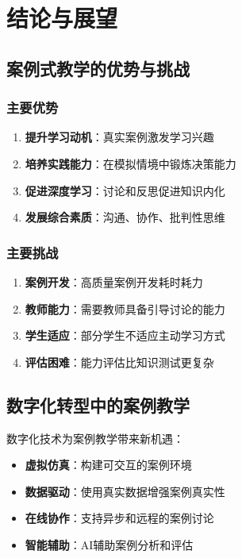 \documentclass[12pt,a4paper]{ctexart}
\begin{document}
\section{结论与展望}

\subsection{案例式教学的优势与挑战}

\subsubsection{主要优势}

\begin{enumerate}[leftmargin=2em]
    \item \textbf{提升学习动机}：真实案例激发学习兴趣
    \item \textbf{培养实践能力}：在模拟情境中锻炼决策能力
    \item \textbf{促进深度学习}：讨论和反思促进知识内化
    \item \textbf{发展综合素质}：沟通、协作、批判性思维
\end{enumerate}

\subsubsection{主要挑战}

\begin{enumerate}[leftmargin=2em]
    \item \textbf{案例开发}：高质量案例开发耗时耗力
    \item \textbf{教师能力}：需要教师具备引导讨论的能力
    \item \textbf{学生适应}：部分学生不适应主动学习方式
    \item \textbf{评估困难}：能力评估比知识测试更复杂
\end{enumerate}

\subsection{数字化转型中的案例教学}

数字化技术为案例教学带来新机遇：

\begin{itemize}[leftmargin=2em]
    \item \textbf{虚拟仿真}：构建可交互的案例环境
    \item \textbf{数据驱动}：使用真实数据增强案例真实性
    \item \textbf{在线协作}：支持异步和远程的案例讨论
    \item \textbf{智能辅助}：AI辅助案例分析和评估
\end{itemize}
\end{document}
